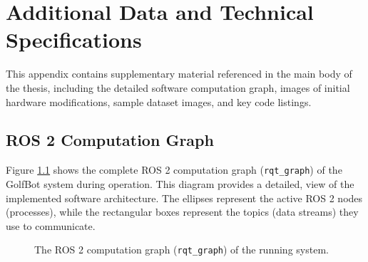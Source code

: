 \chapter{Additional Data and Technical Specifications}
\label{chap:appendix_a}

This appendix contains supplementary material referenced in the main body of the thesis, including the detailed software computation graph, images of initial hardware modifications, sample dataset images, and key code listings.

\section{ROS 2 Computation Graph}
\label{sec:appendix_rqt_graph}
Figure \ref{fig:appendix_rqt_graph} shows the complete ROS 2 computation graph (\texttt{rqt\_graph}) of the GolfBot system during operation. This diagram provides a detailed, view of the implemented software architecture. The ellipses represent the active ROS 2 nodes (processes), while the rectangular boxes represent the topics (data streams) they use to communicate.

\begin{figure}[h!]
    \caption{The ROS 2 computation graph (\texttt{rqt\_graph}) of the running system.}
    \label{fig:appendix_rqt_graph}
\end{figure}


